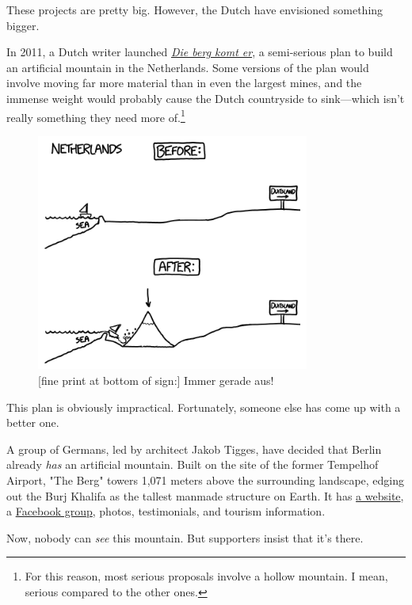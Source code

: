 {{These projects are pretty big. However, the Dutch have envisioned something bigger.}

{In 2011, a Dutch writer launched \emph{ \href{http://www.diebergkomter.nl/}{Die berg komt er}}, a semi-serious plan to build an artificial mountain in the Netherlands. Some versions of the plan would involve moving far more material than in even the largest mines, and the immense weight would probably cause the Dutch countryside to sink—which isn't really something they need more of.{\footnote{For this reason, most serious proposals involve a hollow mountain. I mean, serious compared to the other ones.} } }

\begin{figure}[!htbp]
\centering
\includegraphics[scale=0.5, max width=0.8\textwidth]{imgs/a/95/pyramid_dutch.png}
\caption{[fine print at bottom of sign:] Immer gerade aus!}
\end{figure}

{This plan is obviously impractical. Fortunately, someone else has come up with a better one.}

{A group of Germans, led by architect Jakob Tigges, have decided that Berlin already \emph{has} an artificial mountain. Built on the site of the former Tempelhof Airport, "The Berg" towers 1,071 meters above the surrounding landscape, edging out the Burj Khalifa as the tallest manmade structure on Earth. It has \href{http://www.the-berg.de/}{a website}, a \href{https://www.facebook.com/thebergberlin} {Facebook group}, photos, testimonials, and tourism information.}

{Now, nobody can \emph{see} this mountain. But supporters insist that it's there.}

}

